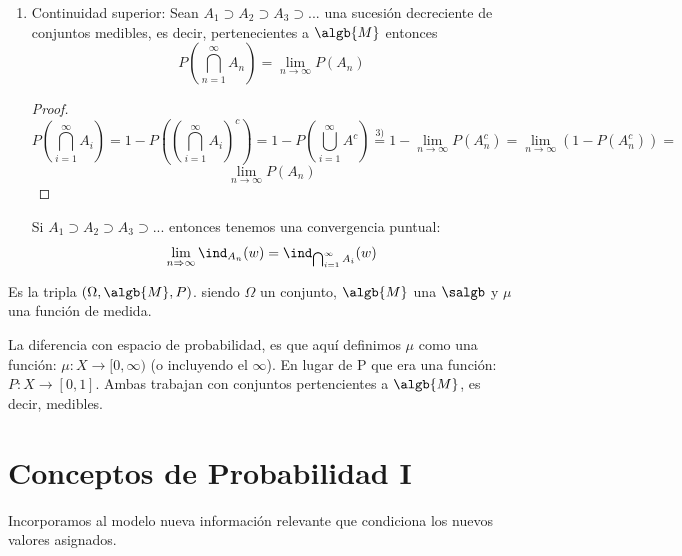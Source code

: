 \documentclass{apuntes}
\begin{document}
\begin{enumerate}
\begin{proof}
Entonces: 
\[P(\lim_{n \rightarrow \infty}A_n)=P(\bigcup_{n=1}^{\infty}A_n)=P(\bigcup_{n=1}^{\infty}D_n)=\sum_{n=1}^{\infty}P(D_n)=\lim_{n \rightarrow \infty}\sum_{i=1}^{n}P(D_i)=\lim_{n \rightarrow \infty}P(\bigcup_{i=1}^{n}D_i) =
\]
\[
=\lim_{n \rightarrow \infty}P(A_n)
\]
\end{proof} 

\obs De esta propiedad podemos afirmar lo siguiente: \[ \bigcup_{n=1}^{\infty}A_n = \lim_{n \rightarrow \infty} A_n \Rightarrow P(\lim_{n \rightarrow \infty} A_n) = \lim_{n \rightarrow \infty} P(A_n)
\]
\obs Si $A_1 \subset A_2 \subset A_3 \subset...$ entonces tenemos una convergencia puntual:
\[
\lim_{n \Rightarrow \infty}\ind_{A_n}(w) = \ind_{\bigcup_{i=1}^{\infty}A_i}(w)
\]

\item Continuidad superior: Sean $A_1 \supset A_2 \supset A_3 \supset ...$ una sucesión decreciente de conjuntos medibles, es decir, pertenecientes a $\algb{M}$ entonces 
\[ P(\bigcap_{n=1}^{\infty}A_n) = \lim_{n \rightarrow \infty} P(A_n)
\]

\begin{proof}
\[P(\bigcap_{i=1}^{\infty}A_i) = 1-P\left((\bigcap_{i=1}^{\infty}A_i)^c\right)=1-P(\bigcup_{i=1}^{\infty}A^c) \stackrel{3)}{=} 1-\lim_{n \rightarrow \infty}P(A_n^c)=\lim_{n \rightarrow \infty}(1-P(A_n^c)) = 
\]
\[
\lim_{n \rightarrow \infty}P(A_n)
\]
\end{proof}

\obs Si $A_1 \supset A_2 \supset A_3 \supset...$ entonces tenemos una convergencia puntual:
\[
\lim_{n \Rightarrow \infty}\ind_{A_n}(w) = \ind_{\bigcap_{i=1}^{\infty}A_i}(w)
\]
\end{enumerate}


\begin{defn}
 Es la tripla $(\Omega, \algb{M}, P)$. siendo $\Omega$ un conjunto, $\algb{M}$ una $\salgb$ y $\mu$ una función de medida.
\end{defn}

La diferencia con espacio de probabilidad, es que aquí definimos $\mu$ como una función: $\mu: X \rightarrow [0,\infty)$  (o incluyendo el $\infty$). En lugar de P que era una función: $P: X \rightarrow [0,1]$. Ambas trabajan con conjuntos pertencientes a $\algb{M}$, es decir, medibles.


\section{Conceptos de Probabilidad I}
Incorporamos al modelo nueva información relevante que condiciona los nuevos valores asignados.
\end{document}
